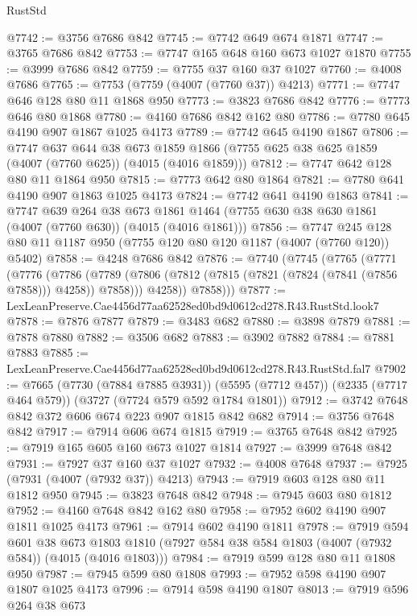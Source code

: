 \begin{lexlean}{RustStd}
\begin{coremodule}
@7742 := @3756 @7686 @842
@7745 := @7742 @649 @674 @1871
@7747 := @3765 @7686 @842
@7753 := @7747 @165 @648 @160 @673 @1027 @1870
@7755 := @3999 @7686 @842
@7759 := @7755 @37 @160 @37 @1027
@7760 := @4008 @7686
@7765 := @7753 (@7759 (@4007 (@7760 @37)) @4213)
@7771 := @7747 @646 @128 @80 @11 @1868 @950
@7773 := @3823 @7686 @842
@7776 := @7773 @646 @80 @1868
@7780 := @4160 @7686 @842 @162 @80
@7786 := @7780 @645 @4190 @907 @1867 @1025 @4173
@7789 := @7742 @645 @4190 @1867
@7806 := @7747
    @637
    @644
    @38
    @673
    @1859
    @1866
    (@7755 @625 @38 @625 @1859 (@4007 (@7760 @625)) (@4015 (@4016 @1859)))
@7812 := @7747 @642 @128 @80 @11 @1864 @950
@7815 := @7773 @642 @80 @1864
@7821 := @7780 @641 @4190 @907 @1863 @1025 @4173
@7824 := @7742 @641 @4190 @1863
@7841 := @7747
    @639
    @264
    @38
    @673
    @1861
    @1464
    (@7755 @630 @38 @630 @1861 (@4007 (@7760 @630)) (@4015 (@4016 @1861)))
@7856 := @7747 @245 @128 @80 @11 @1187 @950 (@7755 @120 @80 @120 @1187 (@4007 (@7760 @120)) @5402)
@7858 := @4248 @7686 @842
@7876 := @7740
    (@7745
      (@7765
        (@7771
          (@7776
            (@7786
              (@7789 (@7806 (@7812 (@7815 (@7821 (@7824 (@7841 (@7856 @7858))) @4258)) @7858)))
              @4258))
          @7858)))
@7877 := LexLeanPreserve.Cae4456d77aa62528ed0bd9d0612cd278.R43.RustStd.look7
@7878 := @7876 @7877
@7879 := @3483 @682
@7880 := @3898 @7879
@7881 := @7878 @7880
@7882 := @3506 @682
@7883 := @3902 @7882
@7884 := @7881 @7883
@7885 := LexLeanPreserve.Cae4456d77aa62528ed0bd9d0612cd278.R43.RustStd.fal7
@7902 := @7665
    (@7730 (@7884 @7885 @3931))
    (@5595 (@7712 @457))
    (@2335 (@7717 @464 @579))
    (@3727 (@7724 @579 @592 @1784 @1801))
@7912 := @3742 @7648 @842 @372 @606 @674 @223 @907 @1815 @842 @682
@7914 := @3756 @7648 @842
@7917 := @7914 @606 @674 @1815
@7919 := @3765 @7648 @842
@7925 := @7919 @165 @605 @160 @673 @1027 @1814
@7927 := @3999 @7648 @842
@7931 := @7927 @37 @160 @37 @1027
@7932 := @4008 @7648
@7937 := @7925 (@7931 (@4007 (@7932 @37)) @4213)
@7943 := @7919 @603 @128 @80 @11 @1812 @950
@7945 := @3823 @7648 @842
@7948 := @7945 @603 @80 @1812
@7952 := @4160 @7648 @842 @162 @80
@7958 := @7952 @602 @4190 @907 @1811 @1025 @4173
@7961 := @7914 @602 @4190 @1811
@7978 := @7919
    @594
    @601
    @38
    @673
    @1803
    @1810
    (@7927 @584 @38 @584 @1803 (@4007 (@7932 @584)) (@4015 (@4016 @1803)))
@7984 := @7919 @599 @128 @80 @11 @1808 @950
@7987 := @7945 @599 @80 @1808
@7993 := @7952 @598 @4190 @907 @1807 @1025 @4173
@7996 := @7914 @598 @4190 @1807
@8013 := @7919
    @596
    @264
    @38
    @673

\end{coremodule}
\end{lexlean}
